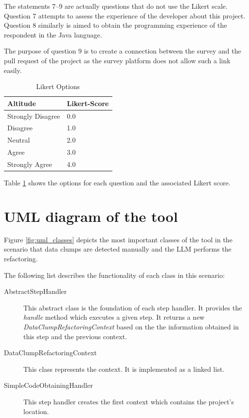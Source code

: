 \begin{appendices}
\begin{enumerate}
\end{enumerate}


The statements 7--9 are actually questions that do not use the Likert scale. Question 7 attempts to assess the experience of the developer about this project. Question 8 similarly is aimed to obtain the programming experience of the respondent in the Java language.

The purpose of question 9 is to create a connection between the survey and the pull request of the project as the survey platform does not allow such a link easily.

\begin{table}[ht!]
    \centering
    \begin{tabular}{m{5cm}|m{1cm}}
         Altitude & Likert-Score  \\\hline
        Strongly Disagree & 0.0\\\hline
        Disagree & 1.0 \\\hline
        Neutral & 2.0 \\\hline
        Agree & 3.0 \\\hline
    Strongly Agree & 4.0\\\hline
        
        
    \end{tabular}
    \caption{Likert Options}
    \label{tab:likert_options}
\end{table}

Table \ref{tab:likert_options} shows the options for each question and the associated Likert score.





\chapter{UML diagram of the tool}
Figure \ref{fig:uml_classes} depicts the most important classes of the tool in the scenario that data clumps are detected manually and the \ac{LLM} performs the refactoring. 

The following list describes the functionality of each class in this scenario:
\begin{description}
    \item [AbstractStepHandler] This abstract class is the foundation of each step handler. It provides the \textit{handle} method which executes a given step. It returns a new \textit{DataClumpRefactoringContext} based on the the information obtained in this step and the previous context.
    \item [DataClumpRefactoringContext] This class represents the context. It is implemented as a linked list. 
    \item[SimpleCodeObtainingHandler] This step handler creates the first context which contains the project's location.


\end{description}
\end{appendices}
